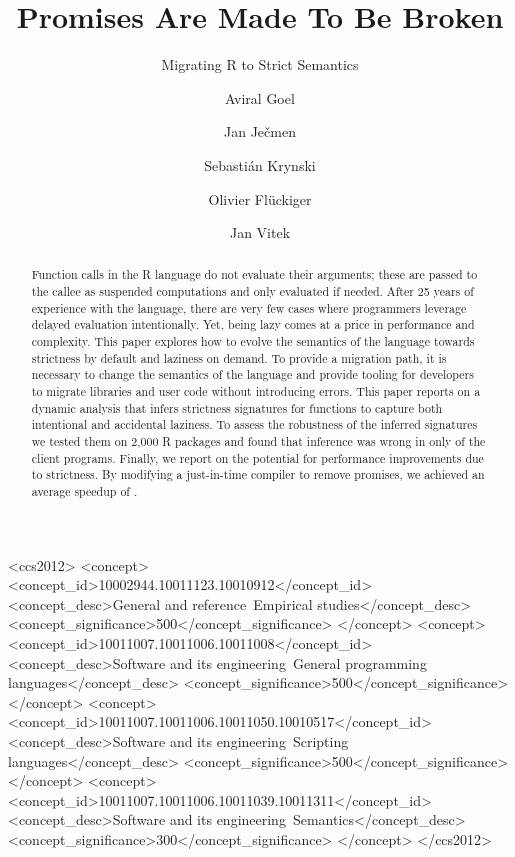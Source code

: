 \documentclass[review,creen,acmsmall]{acmart}
\begin{document}
\title{Promises Are Made To Be Broken}
\subtitle{Migrating R to Strict
  Semantics}

\author{Aviral Goel}
\author{Jan Ječmen}
\author{Sebastián Krynski}
\author{Olivier Flückiger}
\author{Jan Vitek}
\authorsaddresses{}
\renewcommand{\shortauthors}{Goel, et al.}

\begin{abstract}
  Function calls in the R language do not evaluate their arguments; these are
  passed to the callee as suspended computations and only evaluated if needed.
  After 25 years of experience with the language, there are very few cases where
  programmers leverage delayed evaluation intentionally. Yet, being lazy comes
  at a price in performance and complexity. This paper explores how to evolve
  the semantics of the language towards strictness by default and laziness on
  demand. To provide a migration path, it is necessary to change the semantics
  of the language and provide tooling for developers to migrate libraries and
  user code without introducing errors. This paper reports on a dynamic analysis
  that infers strictness signatures for functions to capture both intentional
  and accidental laziness. To assess the robustness of the inferred signatures
  we tested them on 2,000 R packages and found that inference was wrong in only
  \robustnesResult of the client programs. Finally, we report on the potential for
  performance improvements due to strictness. By modifying a just-in-time
  compiler to remove promises, we achieved an average speedup of
  \speedupRshStrict.
\end{abstract}

\begin{CCSXML}
<ccs2012>
<concept>
<concept_id>10002944.10011123.10010912</concept_id>
<concept_desc>General and reference~Empirical studies</concept_desc>
<concept_significance>500</concept_significance>
</concept>
<concept>
<concept_id>10011007.10011006.10011008</concept_id>
<concept_desc>Software and its engineering~General programming languages</concept_desc>
<concept_significance>500</concept_significance>
</concept>
<concept>
<concept_id>10011007.10011006.10011050.10010517</concept_id>
<concept_desc>Software and its engineering~Scripting languages</concept_desc>
<concept_significance>500</concept_significance>
</concept>
<concept>
<concept_id>10011007.10011006.10011039.10011311</concept_id>
<concept_desc>Software and its engineering~Semantics</concept_desc>
<concept_significance>300</concept_significance>
</concept>
</ccs2012>
\end{CCSXML}
\end{document}
